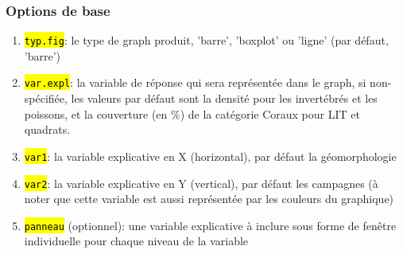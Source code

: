 \documentclass[12pt]{article}
\begin{document}
\subsubsection{Options de base}
\begin{enumerate}
\item \hl{\texttt{typ.fig}}: le type de graph produit, 'barre', 'boxplot' ou 'ligne' (par défaut, 'barre')
\item \hl{\texttt{var.expl}}: la variable de réponse qui sera représentée dans le graph, 
si non-spécifiée, les valeurs par défaut sont la densité pour les invertébrés et les poissons, et la couverture (en \%) de la catégorie Coraux pour LIT et quadrats. 
\item \hl{\texttt{var1}}: la variable explicative en X (horizontal), par défaut la géomorphologie
\item \hl{\texttt{var2}}: la variable explicative en Y (vertical), par défaut les campagnes (à noter que cette variable est aussi représentée par les couleurs du graphique)
\item \hl{\texttt{panneau}} (optionnel): une variable explicative à inclure sous forme de fenêtre individuelle pour chaque niveau de la variable

\end{enumerate}
\end{document}
